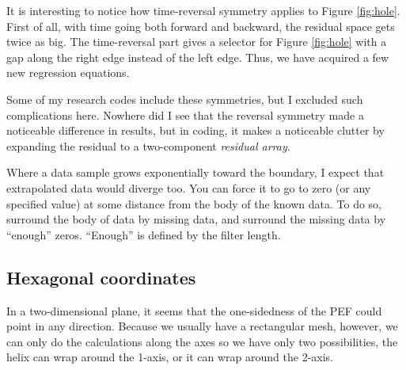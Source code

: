 \par
It is interesting to notice how time-reversal symmetry applies
to Figure \ref{fig:hole}.
First of all, with time going both forward and backward,
the residual space gets twice as big.
The time-reversal part gives a selector
for Figure \ref{fig:hole} with
a gap along the right edge instead of the left edge.
Thus, we have acquired a few new regression equations.

\par
Some of my research codes include these symmetries,
but I excluded such complications here.
Nowhere did I see that the reversal symmetry made a noticeable difference
in results,
but in coding, it makes a noticeable clutter by
expanding the residual to a two-component {\it residual array}.

\par
Where a data sample grows exponentially toward the boundary,
I expect that extrapolated data would diverge too.
You can force it to go to zero (or any specified value)
at some distance from the body of the known data.
To do so, surround the body of data by missing data, and surround the
missing data 
by ``enough'' zeros.
``Enough'' is defined by the filter length.


\subsection{Hexagonal coordinates}
\par
In a two-dimensional plane, it seems
that the one-sidedness of the PEF could
point in any direction.
Because we usually have a rectangular mesh, however,
we can only do the calculations along the axes
so we have only two possibilities,
the helix can
wrap around the 1-axis,
or it can
wrap around the 2-axis.

